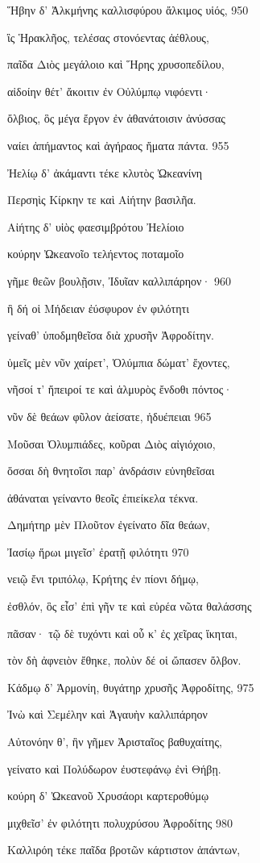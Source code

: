 Ἥβην δ' Ἀλκμήνης καλλισφύρου ἄλκιμος υἱός, 950 

ἲς Ἡρακλῆος, τελέσας στονόεντας ἀέθλους,

παῖδα Διὸς μεγάλοιο καὶ Ἥρης χρυσοπεδίλου,

αἰδοίην θέτ' ἄκοιτιν ἐν Οὐλύμπῳ νιφόεντι· 

ὄλβιος, ὃς μέγα ἔργον ἐν ἀθανάτοισιν ἀνύσσας

ναίει ἀπήμαντος καὶ ἀγήραος ἤματα πάντα. 955

Ἠελίῳ δ' ἀκάμαντι τέκε κλυτὸς Ὠκεανίνη 

Περσηὶς Κίρκην τε καὶ Αἰήτην βασιλῆα.

Αἰήτης δ' υἱὸς φαεσιμβρότου Ἠελίοιο

κούρην Ὠκεανοῖο τελήεντος ποταμοῖο

γῆμε θεῶν βουλῇσιν, Ἰδυῖαν καλλιπάρηον· 960

ἣ δή οἱ Μήδειαν ἐύσφυρον ἐν φιλότητι

γείναθ' ὑποδμηθεῖσα διὰ χρυσῆν Ἀφροδίτην. 

ὑμεῖς μὲν νῦν χαίρετ', Ὀλύμπια δώματ' ἔχοντες, 

νῆσοί τ' ἤπειροί τε καὶ ἁλμυρὸς ἔνδοθι πόντος· 

νῦν δὲ θεάων φῦλον ἀείσατε, ἡδυέπειαι 965

Μοῦσαι Ὀλυμπιάδες, κοῦραι Διὸς αἰγιόχοιο,

ὅσσαι δὴ θνητοῖσι παρ' ἀνδράσιν εὐνηθεῖσαι

ἀθάναται γείναντο θεοῖς ἐπιείκελα τέκνα.

Δημήτηρ μὲν Πλοῦτον ἐγείνατο δῖα θεάων,

Ἰασίῳ ἥρωι μιγεῖσ' ἐρατῇ φιλότητι 970 

νειῷ ἔνι τριπόλῳ, Κρήτης ἐν πίονι δήμῳ,

ἐσθλόν, ὃς εἶσ' ἐπὶ γῆν τε καὶ εὐρέα νῶτα θαλάσσης

πᾶσαν· τῷ δὲ τυχόντι καὶ οὗ κ' ἐς χεῖρας ἵκηται, 

τὸν δὴ ἀφνειὸν ἔθηκε, πολὺν δέ οἱ ὤπασεν ὄλβον.

Κάδμῳ δ' Ἁρμονίη, θυγάτηρ χρυσῆς Ἀφροδίτης, 975

Ἰνὼ καὶ Σεμέλην καὶ Ἀγαυὴν καλλιπάρηον 

Αὐτονόην θ', ἣν γῆμεν Ἀρισταῖος βαθυχαίτης,

γείνατο καὶ Πολύδωρον ἐυστεφάνῳ ἐνὶ Θήβῃ.

κούρη δ' Ὠκεανοῦ Χρυσάορι καρτεροθύμῳ

μιχθεῖσ' ἐν φιλότητι πολυχρύσου Ἀφροδίτης 980

Καλλιρόη τέκε παῖδα βροτῶν κάρτιστον ἁπάντων,

